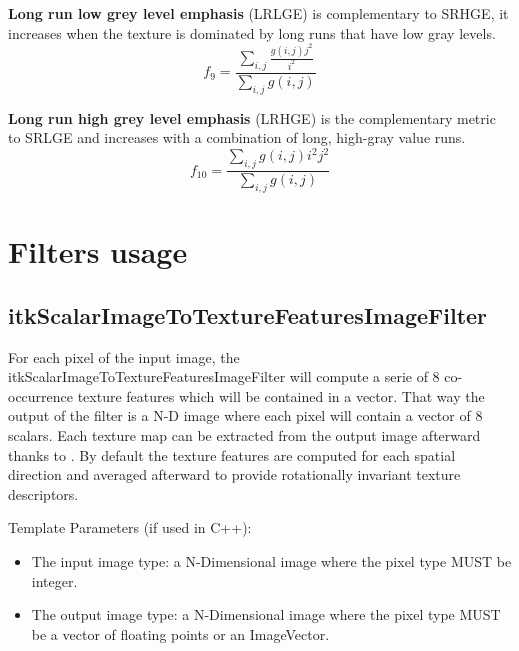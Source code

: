 \documentclass{InsightArticle}
\begin{document}
\textbf{Long run low grey level emphasis} (LRLGE) is complementary to SRHGE, it increases when the texture is dominated by long runs that have low gray levels.
\begin{equation} \label{eqn:ShapeInfluenceTerm}
f_9 = \frac{\sum_{i,j}\nolimits \frac{g(i, j)j^2}{i^2}}{\sum_{i,j}\nolimits g(i, j)} 
\end{equation}

\textbf{Long run high grey level emphasis} (LRHGE) is the complementary metric to SRLGE and increases with a combination of long, high-gray value runs. 
\begin{equation} \label{eqn:ShapeInfluenceTerm}
f_{10} = \frac{\sum_{i,j}\nolimits g(i, j)i^2j^2}{\sum_{i,j}\nolimits g(i, j)} 
\end{equation}

\section{Filters usage}
\label{sec:filterUsage}

\subsection{itkScalarImageToTextureFeaturesImageFilter}
\label{sec:coocFilter}

For each pixel of the input image, the itkScalarImageToTextureFeaturesImageFilter will compute a serie of 8 co-occurrence texture features which will be contained in a vector. That way the output of the filter is a N-D image where each pixel will contain a vector of 8 scalars. Each texture map can be extracted from the output image afterward thanks to . By default the texture features are computed for each spatial direction and averaged afterward to provide rotationally invariant texture descriptors.

Template Parameters (if used in C++):
\begin{itemize}
 \item The input image type: a N-Dimensional image where the pixel type MUST be integer.
 \item The output image type: a N-Dimensional image where the pixel type MUST be a vector of floating points or an ImageVector.
\end{itemize}
\end{document}
